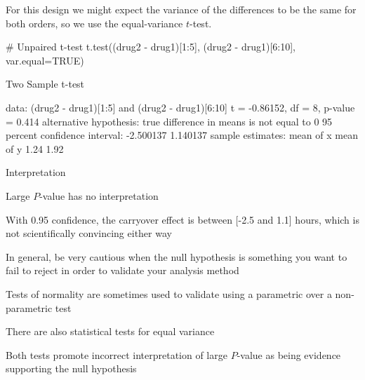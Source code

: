 For this design we might expect the variance of the differences to be
the same for both orders, so we use the equal-variance $t$-test.
\begin{Schunk}
\begin{Sinput}
# Unpaired t-test
t.test((drug2 - drug1)[1:5], (drug2 - drug1)[6:10], var.equal=TRUE)
\end{Sinput}
\begin{Soutput}

	Two Sample t-test

data:  (drug2 - drug1)[1:5] and (drug2 - drug1)[6:10]
t = -0.86152, df = 8, p-value = 0.414
alternative hypothesis: true difference in means is not equal to 0
95 percent confidence interval:
 -2.500137  1.140137
sample estimates:
mean of x mean of y 
     1.24      1.92 
\end{Soutput}
\end{Schunk}
\bi
\item Interpretation
 \bi
 \item Large $P$-value has no interpretation
 \item With 0.95 confidence, the carryover effect is between [-2.5 and 1.1] hours, which is not scientifically convincing either way
 \item In general, be very cautious when the null hypothesis is something you want to fail to reject in order to validate your analysis method
   \bi
     \item Tests of normality are sometimes used to validate using a parametric over a non-parametric test
     \item There are also statistical tests for equal variance
     \item Both tests promote incorrect interpretation of large
       $P$-value as being evidence supporting the null hypothesis 
   \ei
 \ei
\ei


